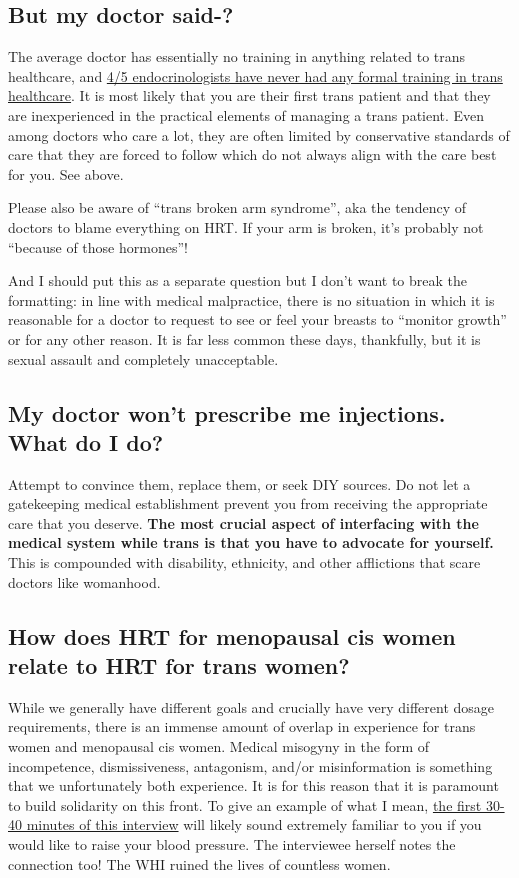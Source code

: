 \documentclass{article}
\begin{document}
\subsection{But my doctor said-?}

The average doctor has essentially no training in anything related to trans healthcare, and \href{https://www.endocrine.org/news-and-advocacy/news-room/2017/endocrinologists-want-training-in-transgender-care }{4/5 endocrinologists have never had any formal training in trans healthcare}. It is most likely that you are their first trans patient and that they are inexperienced in the practical elements of managing a trans patient. Even among doctors who care a lot, they are often limited by conservative standards of care that they are forced to follow which do not always align with the care best for you. See above.

Please also be aware of “trans broken arm syndrome”, aka the tendency of doctors to blame everything on HRT. If your arm is broken, it's probably not “because of those hormones”!

And I should put this as a separate question but I don't want to break the formatting: in line with medical malpractice, there is no situation in which it is reasonable for a doctor to request to see or feel your breasts to “monitor growth” or for any other reason. It is far less common these days, thankfully, but it is sexual assault and completely unacceptable.

\subsection{My doctor won’t prescribe me injections. What do I do?}

Attempt to convince them, replace them, or seek DIY sources. Do not let a gatekeeping medical establishment prevent you from receiving the appropriate care that you deserve. \textbf{The most crucial aspect of interfacing with the medical system while trans is that you have to advocate for yourself. }This is compounded with disability, ethnicity, and other afflictions that scare doctors like womanhood.

\subsection{How does HRT for menopausal cis women relate to HRT for trans women?}\label{11-29}

While we generally have different goals and crucially have very different dosage requirements, there is an immense amount of overlap in experience for trans women and menopausal cis women. Medical misogyny in the form of incompetence, dismissiveness, antagonism, and/or misinformation is something that we unfortunately both experience. It is for this reason that it is paramount to build solidarity on this front. To give an example of what I mean, \href{https://www.youtube.com/watch?v=W0XW6av2wLQ}{the first 30-40 minutes of this interview} will likely sound extremely familiar to you if you would like to raise your blood pressure. The interviewee herself notes the connection too! The WHI ruined the lives of countless women.
\end{document}
